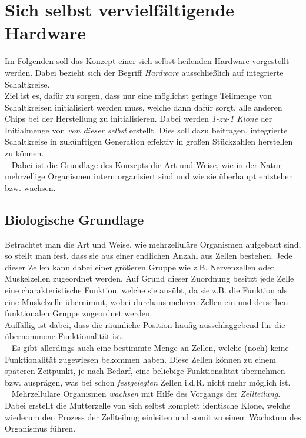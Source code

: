 \documentclass[12p, a4]{article}
\begin{document}
\section{Sich selbst vervielfältigende Hardware}
Im Folgenden soll das Konzept einer sich selbst heilenden Hardware
vorgestellt werden. Dabei bezieht sich der Begriff \textit{Hardware}
ausschließlich auf integrierte Schaltkreise.\\
Ziel ist es, dafür zu sorgen,
dass nur eine möglichst geringe Teilmenge von Schaltkreisen initialisiert
werden muss,
welche dann dafür sorgt, alle anderen Chips bei der Herstellung zu
initialisieren. Dabei werden \textit{1-zu-1 Klone} der Initialmenge von
\textit{von dieser selbst} erstellt. Dies soll dazu beitragen,
integrierte Schaltkreise in zukünftigen Generation effektiv in großen
Stückzahlen herstellen zu können.\\
\ \newline
Dabei ist die Grundlage des Konzepts die Art und Weise, wie in der Natur
mehrzellige Organismen intern organisiert sind und wie sie überhaupt
entstehen bzw. wachsen.\\


\subsection{Biologische Grundlage}
Betrachtet man die Art und Weise, wie mehrzelluläre Organismen aufgebaut sind,
so stellt man fest, dass sie aus einer endlichen Anzahl aus Zellen bestehen.
Jede dieser Zellen kann dabei einer größeren Gruppe wie z.B. Nervenzellen oder
Muskelzellen zugeordnet werden. Auf Grund dieser Zuordnung besitzt jede
Zelle eine charakteristische Funktion, welche sie ausübt, da sie z.B. die
Funktion als eine Muskelzelle übernimmt, wobei durchaus mehrere Zellen ein
und derselben funktionalen Gruppe zugeordnet werden.\\
Auffällig ist dabei,
dass die räumliche Position häufig ausschlaggebend für die übernommene
Funktionalität ist.\\
\ \newline
Es gibt allerdings auch eine bestimmte Menge an Zellen, welche (noch) keine
Funktionalität zugewiesen bekommen haben. Diese Zellen können zu einem
späteren Zeitpunkt, je nach Bedarf, eine beliebige Funktionalität
übernehmen bzw. ausprägen, was bei schon \textit{festgelegten} Zellen i.d.R.
nicht mehr möglich ist.\\
\ \newline
Mehrzelluläre Organismen \textit{wachsen} mit Hilfe des Vorgangs der
\textit{Zellteilung}. Dabei erstellt die Mutterzelle von sich selbst komplett
identische Klone, welche wiederum den Prozess der Zellteilung
einleiten und somit zu einem Wachstum des Organismus führen.\\
\end{document}
